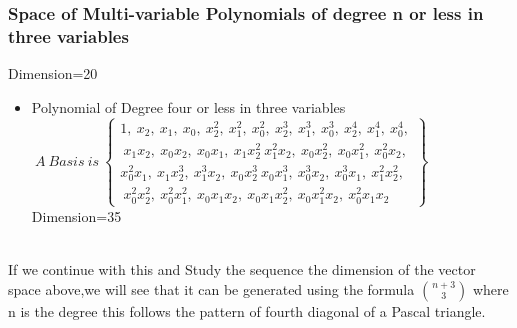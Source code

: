 \documentclass{beamer}
\begin{document}
\begin{frame}
\frametitle{Space of Multi-variable Polynomials of degree n or less in three variables}
\begin{block}{}
Dimension=20
\begin{itemize} 

\item Polynomial of Degree four or less in three variables
     $~A~Basis~is~\begin{Bmatrix}1,~ x_2,~ x_1,~ x_0,~ x_2^2,~ x_1^2,~ x_0^2,~ x_2^3,~ x_1^3,~ x_0^3,~ x_2^4,~ x_1^4,~ x_0^4,\\~ x_1x_2,~ x_0x_2,~ x_0x_1,~ x_1x_2^2~ x_1^2x_2,~ x_0x_2^2,~ x_0x_1^2,~ x_0^2x_2,\\ x_0^2x_1,~ x_1x_2^3,~ x_1^3x_2,~ x_0x_2^3~ x_0x_1^3,~ x_0^3x_2,~ x_0^3x_1,~ x_1^2x_2^2,\\~ x_0^2x_2^2,~ x_0^2x_1^2,~ x_0x_1x_2,~ x_0x_1x_2^2,~ x_0x_1^2x_2,~ x_0^2x_1x_2
\end{Bmatrix}$
Dimension=35\\
\end{itemize}

\\
If we continue with this and Study the sequence the dimension of the vector space above,we will see that it can be generated using the formula $n+3 \choose 3$ where n is the degree this follows the pattern of fourth diagonal of a Pascal triangle.
\end{block}
\end{frame}
\end{document}
